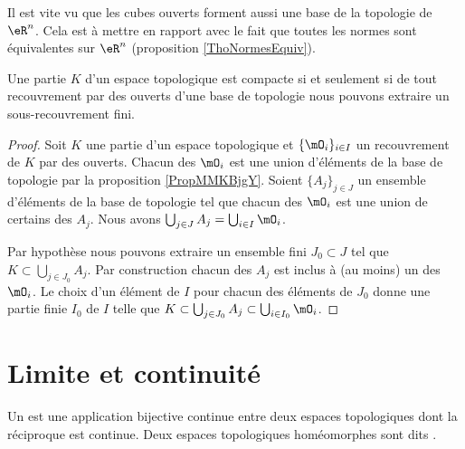 \begin{remark}
    Il est vite vu que les cubes ouverts forment aussi une base de la topologie de \( \eR^n\). Cela est à mettre en rapport avec le fait que toutes les normes sont équivalentes sur \( \eR^n\) (proposition \ref{ThoNormesEquiv}).
\end{remark}


\begin{lemma}   \label{LemOWVooZKndbI}
    Une partie \( K\) d'un espace topologique est compacte si et seulement si de tout recouvrement par des ouverts d'une base de topologie nous pouvons extraire un sous-recouvrement fini.
\end{lemma}

\begin{proof}
    Soit \( K\) une partie d'un espace topologique et \( \{ \mO_i \}_{i\in I}\) un recouvrement de \( K\) par des ouverts. Chacun des \( \mO_i\) est une union d'éléments de la base de topologie par la proposition \ref{PropMMKBjgY}. Soient \( \{ A_j \}_{j\in J}\) un ensemble d'éléments de la base de topologie tel que chacun des \( \mO_i\) est une union de certains des \( A_j\). Nous avons \( \bigcup_{j\in J}A_j=\bigcup_{i\in I}\mO_i\).

    Par hypothèse nous pouvons extraire un ensemble fini \( J_0\subset J\) tel que \( K\subset\bigcup_{j\in J_0}A_j\). Par construction chacun des \( A_j\) est inclus à (au moins) un des \( \mO_i\). Le choix d'un élément de \( I\) pour chacun des éléments de \( J_0\) donne une partie finie \( I_0\) de \( I\) telle que \( K\subset\bigcup_{j\in J_0}A_j\subset\bigcup_{i\in I_0}\mO_i\).
\end{proof}


\section{Limite et continuité}

\begin{definition}
    Un  est une application bijective continue entre deux espaces topologiques dont la réciproque est continue. Deux espaces topologiques homéomorphes sont dits .
\end{definition}


